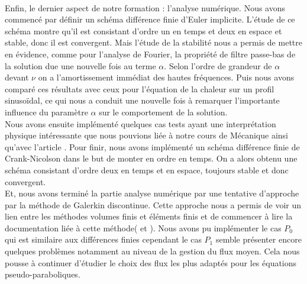 \\
Enfin, le dernier aspect de notre formation : l'analyse numérique. Nous avons commencé par définir un schéma différence finie d'Euler implicite. L'étude de ce schéma montre qu'il est consistant d'ordre un en temps et deux en espace et stable, donc il est convergent. Mais l'étude de la stabilité nous a permis de mettre en évidence, comme pour l'analyse de Fourier, la propriété de filtre passe-bas de la solution due une nouvelle fois au terme $\alpha$. Selon l'ordre de grandeur de $\alpha$ devant $\nu$ on a l'amortissement immédiat des hautes fréquences. Puis nous avons comparé ces résultats avec ceux pour l'équation de la chaleur sur un profil sinusoïdal, ce qui nous a conduit une nouvelle fois à remarquer l'importante influence du paramètre $\alpha$ sur le comportement de la solution.
\\
Nous avons ensuite implémenté quelques cas tests ayant une interprétation physique intéressante que nous pouvions liée à notre cours de Mécanique ainsi qu'avec l'article \cite{Christov2010}. Pour finir, nous avons implémenté un schéma différence finie de Crank-Nicolson dans le but de monter en ordre en temps. On a alors obtenu une schéma consistant d'ordre deux en temps et en espace, toujours stable et donc convergent.
\\
Et, nous avons terminé la partie analyse numérique par une tentative d'approche par la méthode de Galerkin discontinue. Cette approche nous a permis de voir un lien entre les méthodes volumes finis et éléments finis et de commencer à lire la documentation liée à cette méthode(\cite{DiPietro2012} et \cite{Gerald2014}). Nous avons pu implémenter le cas $P_0$ qui est similaire aux différences finies cependant le cas $P_1$ semble présenter encore quelques problèmes notamment au niveau de la gestion du flux moyen. Cela nous pousse à continuer d'étudier le choix des flux les plus adaptés pour les équations pseudo-paraboliques.

